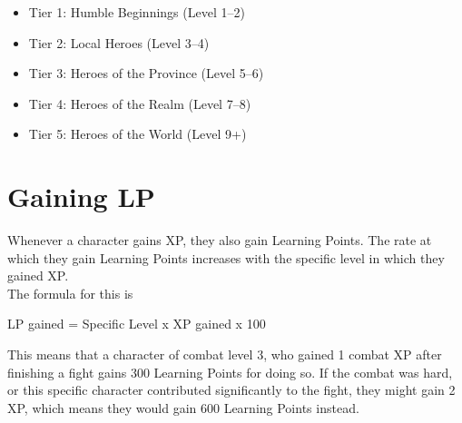 \begin{itemize}
	\item Tier 1: Humble Beginnings (Level 1--2)
	\item Tier 2: Local Heroes (Level 3--4)
	\item Tier 3: Heroes of the Province (Level 5--6)
	\item Tier 4: Heroes of the Realm (Level 7--8)
	\item Tier 5: Heroes of the World (Level 9+)
\end{itemize}

\section{Gaining LP}\label{sec:gainingCP}

Whenever a character gains XP, they also gain Learning Points.
The rate at which they gain Learning Points increases with the specific level in which they gained XP.\\
The formula for this is\\

\begin{center}
	LP gained = Specific Level x XP gained  x 100
\end{center}

This means that a character of combat level 3, who gained 1 combat XP after finishing a fight gains 300 Learning Points for doing so.
If the combat was hard, or this specific character contributed significantly to the fight, they might gain 2 XP, which means they would gain 600 Learning Points instead.\\






